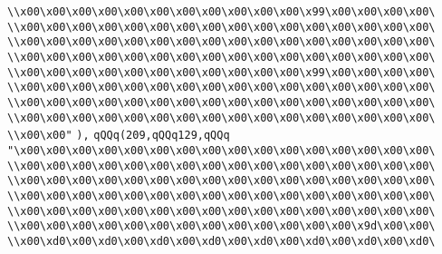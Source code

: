 \verb|\\x00\x00\x00\x00\x00\x00\x00\x00\x00\x00\x00\x99\x00\x00\x00\x00\|\newline
\verb|\\x00\x00\x00\x00\x00\x00\x00\x00\x00\x00\x00\x00\x00\x00\x00\x00\|\newline
\verb|\\x00\x00\x00\x00\x00\x00\x00\x00\x00\x00\x00\x00\x00\x00\x00\x00\|\newline
\verb|\\x00\x00\x00\x00\x00\x00\x00\x00\x00\x00\x00\x00\x00\x00\x00\x00\|\newline
\verb|\\x00\x00\x00\x00\x00\x00\x00\x00\x00\x00\x00\x99\x00\x00\x00\x00\|\newline
\verb|\\x00\x00\x00\x00\x00\x00\x00\x00\x00\x00\x00\x00\x00\x00\x00\x00\|\newline
\verb|\\x00\x00\x00\x00\x00\x00\x00\x00\x00\x00\x00\x00\x00\x00\x00\x00\|\newline
\verb|\\x00\x00\x00\x00\x00\x00\x00\x00\x00\x00\x00\x00\x00\x00\x00\x00\|\newline
\verb|\\x00\x00"|\newline
\verb|),|\newline
\verb|qQQq(209,qQQq129,qQQq|\newline
\verb|"\x00\x00\x00\x00\x00\x00\x00\x00\x00\x00\x00\x00\x00\x00\x00\x00\|\newline
\verb|\\x00\x00\x00\x00\x00\x00\x00\x00\x00\x00\x00\x00\x00\x00\x00\x00\|\newline
\verb|\\x00\x00\x00\x00\x00\x00\x00\x00\x00\x00\x00\x00\x00\x00\x00\x00\|\newline
\verb|\\x00\x00\x00\x00\x00\x00\x00\x00\x00\x00\x00\x00\x00\x00\x00\x00\|\newline
\verb|\\x00\x00\x00\x00\x00\x00\x00\x00\x00\x00\x00\x00\x00\x00\x00\x00\|\newline
\verb|\\x00\x00\x00\x00\x00\x00\x00\x00\x00\x00\x00\x00\x00\x9d\x00\x00\|\newline
\verb|\\x00\xd0\x00\xd0\x00\xd0\x00\xd0\x00\xd0\x00\xd0\x00\xd0\x00\xd0\|\newline
